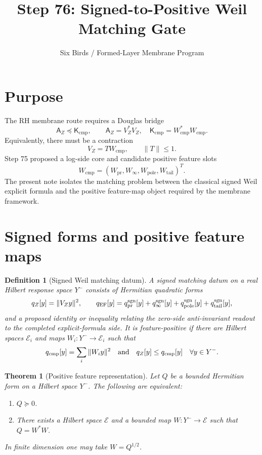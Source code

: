 \documentclass[11pt]{article}
\title{Step 76: Signed-to-Positive Weil Matching Gate}
\author{Six Birds / Formed-Layer Membrane Program}
\date{}
\newtheorem{theorem}{Theorem}
\newtheorem{definition}{Definition}
\newcommand{\K}{\mathsf K}
\newcommand{\A}{\mathsf A}
\newcommand{\Y}{Y^-}
\newcommand{\Wcmp}{W_{\mathrm{cmp}}}
\newcommand{\VZ}{V_Z}
\begin{document}
\maketitle

\section{Purpose}
The RH membrane route requires a Douglas bridge
\[
  \A_Z\preceq \K_{\mathrm{cmp}},
  \qquad
  \A_Z=\VZ^*\VZ,\quad \K_{\mathrm{cmp}}=\Wcmp^*\Wcmp.
\]
Equivalently, there must be a contraction
\[
  \VZ=T\Wcmp,
  \qquad \|T\|\le 1.
\]
Step 75 proposed a log-side core and candidate positive feature slots
\[
  \Wcmp=(W_{\mathrm{pr}},W_{\infty},W_{\mathrm{pole}},W_{\mathrm{tail}})^T.
\]
The present note isolates the matching problem between the classical signed Weil explicit formula and the positive feature-map object required by the membrane framework.

\section{Signed forms and positive feature maps}

\begin{definition}[Signed Weil matching datum]
A signed matching datum on a real Hilbert response space \(\Y\) consists of Hermitian quadratic forms
\[
  q_Z[y]=\|\VZ y\|^2,
  \qquad
  q_{\rm EF}[y]=q_{\rm pr}^{\rm sgn}[y]+q_{\infty}^{\rm sgn}[y]+q_{\rm pole}^{\rm sgn}[y]+q_{\rm tail}^{\rm sgn}[y],
\]
and a proposed identity or inequality relating the zero-side anti-invariant readout to the completed explicit-formula side.
It is \emph{feature-positive} if there are Hilbert spaces \(\mathcal E_i\) and maps \(W_i:\Y\to\mathcal E_i\) such that
\[
  q_{\rm cmp}[y]
  =\sum_i \|W_i y\|^2
  \quad\text{and}\quad
  q_Z[y]\le q_{\rm cmp}[y]
  \quad\forall y\in\Y.
\]
\end{definition}

\begin{theorem}[Positive feature representation]
Let \(Q\) be a bounded Hermitian form on a Hilbert space \(\Y\). The following are equivalent:
\begin{enumerate}[label=(\roman*)]
\item \(Q\succeq0\).
\item There exists a Hilbert space \(\mathcal E\) and a bounded map \(W:\Y\to\mathcal E\) such that \(Q=W^*W\).
\end{enumerate}
In finite dimension one may take \(W=Q^{1/2}\).
\end{theorem}
\end{document}
